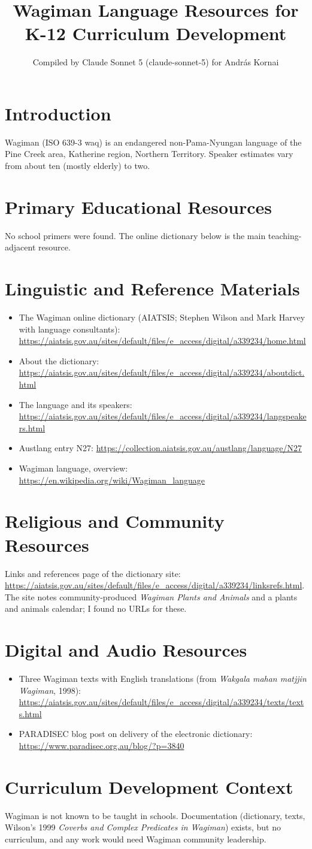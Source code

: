\documentclass[12pt]{article}
\title{Wagiman Language Resources for K-12 Curriculum Development}
\author{Compiled by Claude Sonnet 5 (claude-sonnet-5) for Andr\'as Kornai}
\date{}
\begin{document}
\maketitle
\section{Introduction}
Wagiman (ISO 639-3 waq) is an endangered non-Pama-Nyungan language of the Pine Creek area, Katherine region, Northern Territory. Speaker estimates vary from about ten (mostly elderly) to two.
\section{Primary Educational Resources}
No school primers were found. The online dictionary below is the main teaching-adjacent resource.
\section{Linguistic and Reference Materials}
\begin{itemize}
\item The Wagiman online dictionary (AIATSIS; Stephen Wilson and Mark Harvey with language consultants): \url{https://aiatsis.gov.au/sites/default/files/e_access/digital/a339234/home.html}
\item About the dictionary: \url{https://aiatsis.gov.au/sites/default/files/e_access/digital/a339234/aboutdict.html}
\item The language and its speakers: \url{https://aiatsis.gov.au/sites/default/files/e_access/digital/a339234/langspeakers.html}
\item Austlang entry N27: \url{https://collection.aiatsis.gov.au/austlang/language/N27}
\item Wagiman language, overview: \url{https://en.wikipedia.org/wiki/Wagiman_language}
\end{itemize}
\section{Religious and Community Resources}
Links and references page of the dictionary site: \url{https://aiatsis.gov.au/sites/default/files/e_access/digital/a339234/linksrefs.html}. The site notes community-produced \emph{Wagiman Plants and Animals} and a plants and animals calendar; I found no URLs for these.
\section{Digital and Audio Resources}
\begin{itemize}
\item Three Wagiman texts with English translations (from \emph{Wakgala mahan matjjin Wagiman}, 1998): \url{https://aiatsis.gov.au/sites/default/files/e_access/digital/a339234/texts/texts.html}
\item PARADISEC blog post on delivery of the electronic dictionary: \url{https://www.paradisec.org.au/blog/?p=3840}
\end{itemize}
\section{Curriculum Development Context}
Wagiman is not known to be taught in schools. Documentation (dictionary, texts, Wilson's 1999 \emph{Coverbs and Complex Predicates in Wagiman}) exists, but no curriculum, and any work would need Wagiman community leadership.
\end{document}

